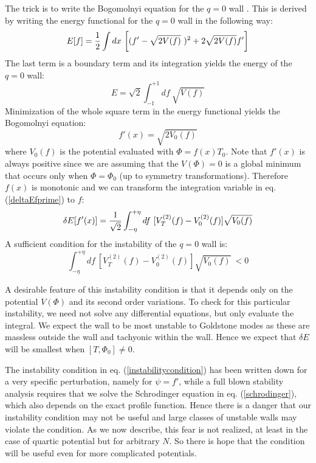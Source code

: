 \documentclass[a4paper,prd,nofootinbib,twocolumn,showpacs]{revtex4}
\begin{document}
The trick is to write the Bogomolnyi equation for the $q=0$
wall \cite{Bog76}. This is derived
by writing the energy functional for the $q=0$ wall in the 
following way:
\begin{equation}
E[f] = {1\over 2}\int dx ~ \biggl [ (f' - \sqrt{2V(f)} ~ )^2
                         + 2\sqrt{2V(f)} f' \biggr ]
\label{towardsbogo}
\end{equation}
The last term is a boundary term and its integration yields
the energy of the $q=0$ wall:
\begin{equation}
E = \sqrt{2} \int_{-1}^{+1} df ~ \sqrt{V(f)}
\label{bogoenergy}
\end{equation}
Minimization of the whole square term in the energy functional
yields the Bogomolnyi equation:
\begin{equation}
f'(x) = \sqrt{2 V_0 (f)}
\label{bogoeq}
\end{equation}
where $V_0 (f)$ is the potential evaluated with $\Phi = f(x)T_0$.
Note that $f'(x)$ is always positive since we are assuming that
the $V(\Phi ) = 0$ is a global minimum that occurs only when
$\Phi = \Phi_0$ (up to symmetry transformations). Therefore $f(x)$
is monotonic and we can transform the integration variable in
eq. (\ref{deltaEfprime}) to $f$:
\begin{equation}
\delta E [ f'(x) ] = 
 {1\over {\sqrt{2}}} \int_{-\eta}^{+\eta} df ~
                   [ V_T^{(2)} (f) - V_0^{(2)} (f) ] \sqrt{V_0 (f)}
\label{deltaEfprimewrtf}
\end{equation}
A sufficient condition for the instability of the $q=0$ wall is:
\begin{equation}
 \int_{-\eta}^{+\eta} df ~ 
        [ V_T^{(2)} (f) - V_0^{(2)} (f) ] \sqrt{V_0 (f)} ~ < 0
\label{instabilitycondition}
\end{equation}

A desirable feature of this instability condition is that it depends 
only on the potential $V(\Phi )$ and its second order variations. To 
check for this particular instability, we need not solve any
differential equations, but only evaluate the integral.
We expect the wall to be most unstable to Goldstone modes as
these are massless outside the wall and tachyonic within the wall.
Hence we expect that $\delta E$ will be smallest when $[T,\Phi_0] \ne 0$. 

The instability condition in eq. (\ref{instabilitycondition})
has been written down for a very specific perturbation, namely
for $\psi = f'$, while a full blown stability analysis requires
that we solve the Schrodinger equation in eq. (\ref{schrodinger}),
which also depends on the exact profile function. Hence there is 
a danger that our instability condition may not be useful and
large classes of unstable walls may violate the condition. As we
now describe, this fear is not realized, at least in the case of 
quartic potential but for arbitrary $N$. So there is hope that the
condition will be useful even for more complicated potentials.
\end{document}
